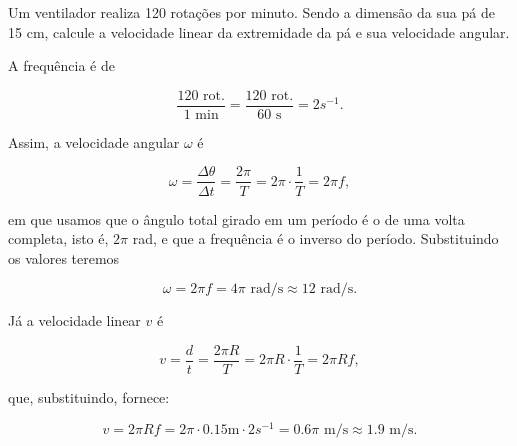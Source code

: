 \vspace{0.3cm}


\begin{exemplo}[Nível I]\label{exemplo_cinvet_velocidadeangularex01}

Um ventilador realiza 120 rotações por minuto. Sendo a dimensão da sua pá de 15 cm, calcule a velocidade linear da extremidade da pá e sua velocidade angular.

\resolucao

A frequência é de 

$$\dfrac{120 \text{ rot.}}{1\text{ min}} = \dfrac{120 \text{ rot.}}{60 \text{ s}} = 2 s^{-1}.$$ 


Assim, a velocidade angular $\omega$ é

$$ \omega = \dfrac{\Delta \theta}{\Delta t} = \dfrac{2 \pi}{T} = 2 \pi \cdot \dfrac{1}{T} = 2 \pi f,$$

\noindent em que usamos que o ângulo total girado em um período é o de uma volta completa, isto é, $2 \pi $ rad, e que a frequência é o inverso do período. Substituindo os valores teremos

$$ \omega =2 \pi f =4 \pi\text{ rad/s} \approx 12 \text{ rad/s}.  $$

Já a velocidade linear $v$ é

$$ v = \dfrac{d}{t} = \dfrac{2 \pi R}{T} = 2 \pi R \cdot \dfrac{1}{T} = 2 \pi R f,$$

\noindent que, substituindo, fornece:

$$ v = 2 \pi R f = 2 \pi \cdot 0.15 \text{m} \cdot 2 s^{-1} = 0.6 \pi \text{ m/s} \approx 1.9 \text{ m/s}.$$

\end{exemplo}



\vspace{0.3cm}


